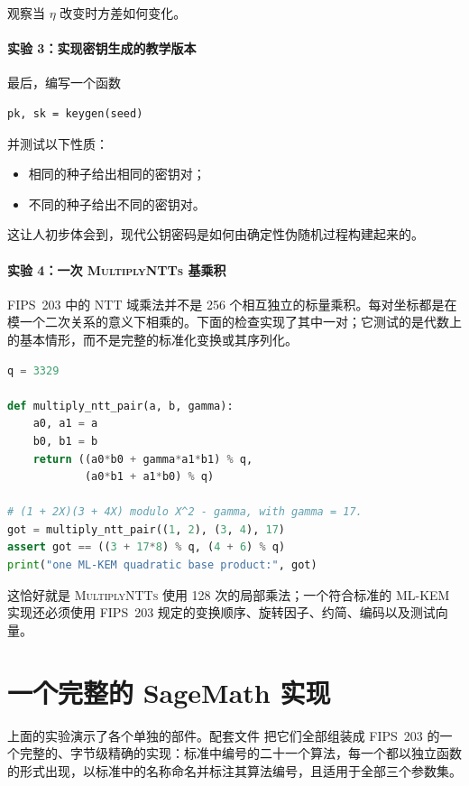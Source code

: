观察当 \(\eta\) 改变时方差如何变化。

\paragraph{实验 3：实现密钥生成的教学版本}

最后，编写一个函数

\begin{lstlisting}
pk, sk = keygen(seed)
\end{lstlisting}

并测试以下性质：

\begin{itemize}
  \item 相同的种子给出相同的密钥对；
  \item 不同的种子给出不同的密钥对。
\end{itemize}

这让人初步体会到，现代公钥密码是如何由确定性伪随机过程构建起来的。

\paragraph{实验 4：一次 \textsc{MultiplyNTTs} 基乘积}

FIPS~203 中的 NTT 域乘法并不是 256 个相互独立的标量乘积。每对坐标都是在模一个二次关系的意义下相乘的。下面的检查实现了其中一对；它测试的是代数上的基本情形，而不是完整的标准化变换或其序列化。

\begin{lstlisting}[language=Python]
q = 3329

def multiply_ntt_pair(a, b, gamma):
    a0, a1 = a
    b0, b1 = b
    return ((a0*b0 + gamma*a1*b1) % q,
            (a0*b1 + a1*b0) % q)

# (1 + 2X)(3 + 4X) modulo X^2 - gamma, with gamma = 17.
got = multiply_ntt_pair((1, 2), (3, 4), 17)
assert got == ((3 + 17*8) % q, (4 + 6) % q)
print("one ML-KEM quadratic base product:", got)
\end{lstlisting}

这恰好就是 \textsc{MultiplyNTTs} 使用 128 次的局部乘法；一个符合标准的 ML-KEM 实现还必须使用 FIPS~203 规定的变换顺序、旋转因子、约简、编码以及测试向量。

\section{一个完整的 SageMath 实现}
\label{sec:fips203-impl}

上面的实验演示了各个单独的部件。配套文件  把它们全部组装成 FIPS~203 的一个完整的、字节级精确的实现：标准中编号的二十一个算法，每一个都以独立函数的形式出现，以标准中的名称命名并标注其算法编号，且适用于全部三个参数集。

